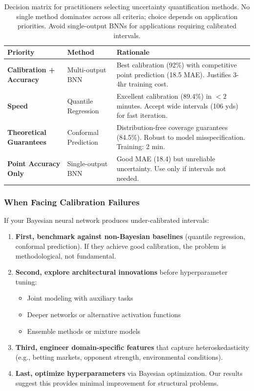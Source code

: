 \begin{table}[t]
\centering
\begin{tabular}{@{}llp{6cm}@{}}
\toprule
\textbf{Priority}  & \textbf{Method}  & \textbf{Rationale} \\
\midrule
\textbf{Calibration + Accuracy} & Multi-output BNN & Best calibration (92\%) with competitive point prediction (18.5 MAE). Justifies 3-4hr training cost. \\
\addlinespace
\textbf{Speed} & Quantile Regression & Excellent calibration (89.4\%) in $<2$ minutes. Accept wide intervals (106 yds) for fast iteration. \\
\addlinespace
\textbf{Theoretical Guarantees} & Conformal Prediction & Distribution-free coverage guarantees (84.5\%). Robust to model misspecification. Training: 2 min. \\
\addlinespace
\textbf{Point Accuracy Only} & Single-output BNN & Good MAE (18.4) but unreliable uncertainty. Use only if intervals not needed. \\
\bottomrule
\end{tabular}
\caption{Decision matrix for practitioners selecting uncertainty quantification methods. No single method dominates across all criteria; choice depends on application priorities. Avoid single-output BNNs for applications requiring calibrated intervals.}
\label{tab:practitioner_decision_matrix}
\end{table}

\subsubsection{When Facing Calibration Failures}

If your Bayesian neural network produces under-calibrated intervals:

\begin{enumerate}
    \item \textbf{First, benchmark against non-Bayesian baselines} (quantile regression, conformal prediction). If they achieve good calibration, the problem is methodological, not fundamental.

    \item \textbf{Second, explore architectural innovations} before hyperparameter tuning:
    \begin{itemize}
        \item Joint modeling with auxiliary tasks
        \item Deeper networks or alternative activation functions
        \item Ensemble methods or mixture models
    \end{itemize}

    \item \textbf{Third, engineer domain-specific features} that capture heteroskedasticity (e.g., betting markets, opponent strength, environmental conditions).

    \item \textbf{Last, optimize hyperparameters} via Bayesian optimization. Our results suggest this provides minimal improvement for structural problems.
\end{enumerate}

